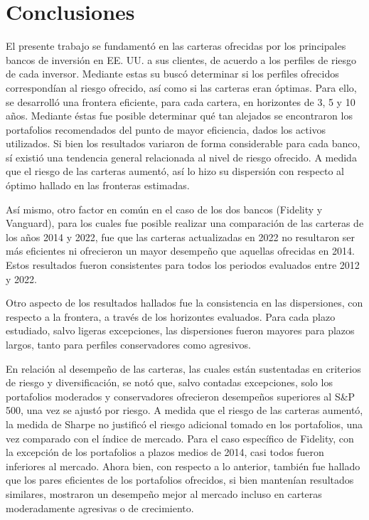 \documentclass[a4paper,fleqn]{cas-sc}
\begin{document}
\section{Conclusiones}
El presente trabajo se fundamentó en las carteras ofrecidas por los principales bancos de inversión en EE. UU. a sus clientes, de acuerdo a los perfiles de riesgo de cada inversor. Mediante estas su buscó determinar si los perfiles ofrecidos correspondían al riesgo ofrecido, así como si las carteras eran óptimas. Para ello, se desarrolló una frontera eficiente, para cada cartera, en horizontes de 3, 5 y 10 años. Mediante éstas fue posible determinar qué tan alejados se encontraron los portafolios recomendados del punto de mayor eficiencia, dados los activos utilizados. Si bien los resultados variaron de forma considerable para cada banco, sí existió una tendencia general relacionada al nivel de riesgo ofrecido. A medida que el riesgo de las carteras aumentó, así lo hizo su dispersión con respecto al óptimo hallado en las fronteras estimadas. 

Así mismo, otro factor en común en el caso de los dos bancos (Fidelity y Vanguard), para los cuales fue posible realizar una comparación de las carteras de los años 2014 y 2022, fue que las carteras actualizadas en 2022 no resultaron ser más eficientes ni ofrecieron un mayor desempeño que aquellas ofrecidas en 2014. Estos resultados fueron consistentes para todos los periodos evaluados entre 2012 y 2022.

Otro aspecto de los resultados hallados fue la consistencia en las dispersiones, con respecto a la frontera, a través de los horizontes evaluados. Para cada plazo estudiado, salvo ligeras excepciones, las dispersiones fueron mayores para plazos largos, tanto para perfiles conservadores como agresivos. 

En relación al desempeño de las carteras, las cuales están sustentadas en criterios de riesgo y diversificación, se notó que, salvo contadas excepciones, solo los portafolios moderados y conservadores ofrecieron desempeños superiores al S\&P 500, una vez se ajustó por riesgo. A medida que el riesgo de las carteras aumentó, la medida de Sharpe no justificó el riesgo adicional tomado en los portafolios, una vez comparado con el índice de mercado. Para el caso específico de Fidelity, con la excepción de los portafolios a plazos medios de 2014, casi todos fueron inferiores al mercado. Ahora bien, con respecto a lo anterior, también fue hallado que los pares eficientes de los portafolios ofrecidos, si bien mantenían resultados similares, mostraron un desempeño mejor al mercado incluso en carteras moderadamente agresivas o de crecimiento.  
\end{document}
